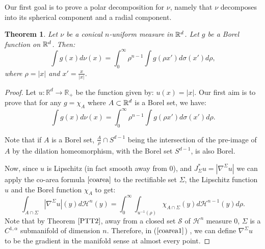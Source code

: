 \documentclass[11pt]{article}
\newtheorem{theorem}{Theorem}[section]
\theoremstyle{definition}
\theoremstyle{remark}
\numberwithin{equation}{section}
\begin{document}
Our first goal is to prove a polar decomposition for $\nu$, namely that $\nu$ decomposes into its spherical component and a radial component.

\begin{theorem}\label{polar} Let $\nu$ be a conical $n$-uniform measure in $\mathbb{R}^{d}$. Let $g$ be a Borel function on $\mathbb{R}^{d}$. Then:
\begin{equation}\label{eqpolar}
\int g(x) d\nu(x)= \int_{0}^{\infty} \rho^{n-1} \int g(\rho x') d\sigma(x') d\rho, 
\end{equation} 
where $\rho=|x|$ and $x'=\frac{x}{|x|}$. \end{theorem}
\begin{proof}
Let $u: \mathbb{R}^d \to \mathbb{R}_+$ be the function given by: $u(x)=|x|$.
Our first aim is to prove that for any $g=\chi_{A}$ where  $A \subset \mathbb{R}^{d}$ is a Borel set, we have:
\begin{equation} \label{polarstep1}
\int g(x) d\nu(x)= \int_{0}^{\infty} \rho^{n-1} \int g(\rho x') d\sigma(x') d\rho.
\end{equation}

Note that if $A$ is a Borel set, $\frac{A}{\rho} \cap S^{d-1}$ being the intersection of the pre-image of $A$ by the dilation homeomorphism, with the Borel set $S^{d-1}$, is also Borel.

Now, since $u$ is Lipschitz (in fact smooth away from 0), and $J_{\Sigma}^{*}u=|\nabla^{\Sigma}u|$  we can apply the co-area formula  $\eqref{coarea}$  to the rectifiable set $\Sigma$, the Lipschitz function $u$ and the Borel function $\chi_{A}$ to get:
\begin{equation}\label{coarea1} \int_{A \cap \Sigma} |\nabla^{\Sigma}u|(y) d\mathcal{H}^n(y)= \int_{0}^{\infty}  \int_{u^{-1}(\rho)} \chi_{A \cap \Sigma}(y) d\mathcal{H}^{n-1}(y) d\rho. 
\end{equation}
Note that by Theorem $\ref{PTT2}$, away from a closed set $\mathcal{S}$ of $\mathcal{H}^n$ measure 0, $\Sigma$ is a $C^{1,\alpha}$ submanifold of dimension $n$. Therefore, in ($\ref{coarea1}$) , we can define $\nabla^{\Sigma}u$ to be the gradient in the manifold sense at almost every point.


\end{proof}
\end{document}
